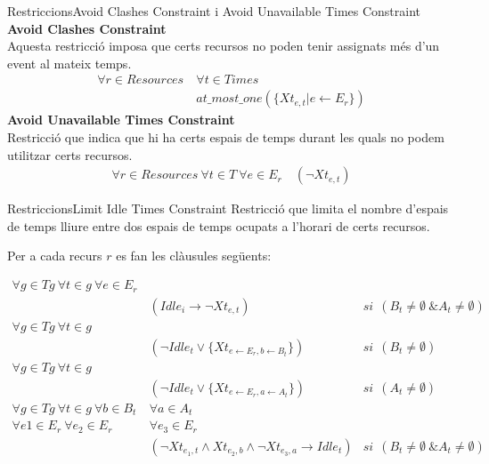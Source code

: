 \documentclass[13pt]{beamer}
\begin{document}
  \begin{frame}{Restriccions}{Avoid Clashes Constraint i Avoid Unavailable Times Constraint}  
      \textbf{Avoid Clashes Constraint}\\
      Aquesta restricció imposa que certs recursos no poden tenir assignats més d'un event al mateix temps. 
        \begin{align*}
          \forall r \in Resources \ & \forall t \in Times \\
          &at\_most\_one(\{Xt_{e,t} | e \leftarrow E_r\})
        \end{align*}
        \textbf{Avoid Unavailable Times Constraint}\\
        Restricció que indica que hi ha certs espais de temps durant les quals no podem utilitzar certs recursos.
        \begin{align*}
          \forall r \in Resources \ \forall t \in T \ \forall e \in E_r \quad
          (\neg Xt_{e,t})
        \end{align*}  
  \end{frame}
  \begin{frame}{Restriccions}{Limit Idle Times Constraint}
    Restricció que limita el nombre d'espais de temps lliure entre dos espais de temps ocupats a l'horari de certs recursos. 
    
    Per a cada recurs $r$ es fan les clàusules següents:

       \begin{align*}
        \forall g \in Tg \ \forall t \in g \ \forall e \in E_r& \\
        &(Idle_i \rightarrow \neg Xt_{e, t}) & si \ \ (B_t \neq \emptyset \ \& A_t \neq \emptyset) \\
        \forall g \in Tg \ \forall t \in g  \ & \\
        & (\neg Idle_t \lor \{Xt_{e\leftarrow E_r,b\leftarrow B_t}\}) & si \ \ (B_t \neq \emptyset)\\
        \forall g \in Tg \ \forall t \in g & \\
        & (\neg Idle_t \lor \{Xt_{e\leftarrow E_r,a\leftarrow A_t}\}) & si \ \ (A_t \neq \emptyset)\\
        \forall g \in Tg \ \forall t \in g \ \forall b \in B_t \ & \forall a \in A_t \\
        \forall e1 \in E_r \ \forall e_2 \in E_r \  &\forall e_3 \in E_r \\
        & (\neg Xt_{e_{1}, t} \land Xt_{e_2, b} \land \neg Xt_{e_3, a} \rightarrow Idle_t) & si \ \ (B_t \neq \emptyset \ \& A_t \neq \emptyset)
       \end{align*}
    
      \end{frame}
\end{document}
